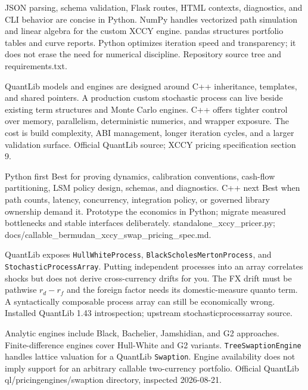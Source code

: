 {JSON parsing, schema validation, Flask routes, HTML contexts, diagnostics, and CLI behavior are concise in Python.}
{NumPy handles vectorized path simulation and linear algebra for the custom XCCY engine.}
{pandas structures portfolio tables and curve reports.}
{Python optimizes iteration speed and transparency; it does not erase the need for numerical discipline.}
{Repository source tree and requirements.txt.}

{QuantLib models and engines are designed around C++ inheritance, templates, and shared pointers.}
{A production custom stochastic process can live beside existing term structures and Monte Carlo engines.}
{C++ offers tighter control over memory, parallelism, deterministic numerics, and wrapper exposure.}
{The cost is build complexity, ABI management, longer iteration cycles, and a larger validation surface.}
{Official QuantLib source; XCCY pricing specification section 9.}

{Python first}
{Best for proving dynamics, calibration conventions, cash-flow partitioning, LSM policy design, schemas, and diagnostics.}
{C++ next}
{Best when path counts, latency, concurrency, integration policy, or governed library ownership demand it.}
{Prototype the economics in Python; migrate measured bottlenecks and stable interfaces deliberately.}
{standalone\_xccy\_pricer.py; docs/callable\_bermudan\_xccy\_swap\_pricing\_spec.md.}

{QuantLib exposes \texttt{HullWhiteProcess}, \texttt{BlackScholesMertonProcess}, and \texttt{StochasticProcessArray}.}
{Putting independent processes into an array correlates shocks but does not derive cross-currency drifts for you.}
{The FX drift must be pathwise $r_d-r_f$ and the foreign factor needs its domestic-measure quanto term.}
{A syntactically composable process array can still be economically wrong.}
{Installed QuantLib 1.43 introspection; upstream stochasticprocessarray source.}

{Analytic engines include Black, Bachelier, Jamshidian, and G2 approaches.}
{Finite-difference engines cover Hull-White and G2 variants.}
{\texttt{TreeSwaptionEngine} handles lattice valuation for a QuantLib \texttt{Swaption}.}
{Engine availability does not imply support for an arbitrary callable two-currency portfolio.}
{Official QuantLib ql/pricingengines/swaption directory, inspected 2026-08-21.}

